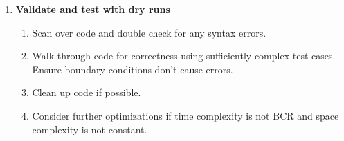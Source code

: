 \documentclass{article}
\begin{document}
\begin{enumerate}
     \item \textbf{Validate and test with dry runs}
    \begin{enumerate}
        \item Scan over code and double check for any syntax errors.
        \item Walk through code for correctness using sufficiently complex test cases. Ensure boundary conditions don't cause errors.
        \item Clean up code if possible.
        \item Consider further optimizations if time complexity is not BCR and space complexity is not constant.
    \end{enumerate}
\end{enumerate}

    
    
    
    

\end{document}
